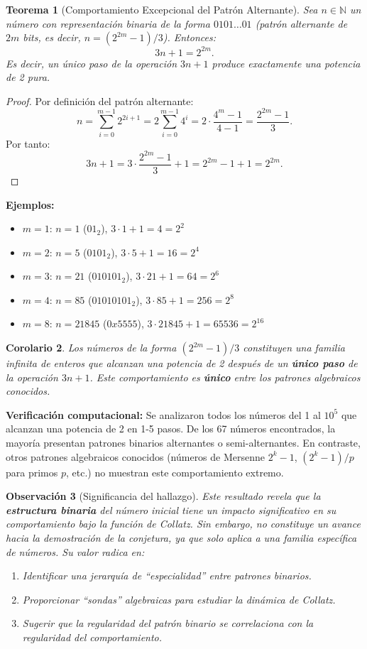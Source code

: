 \documentclass[11pt,a4paper]{article}
\newtheorem{theorem}{Teorema}[section]
\newtheorem{corollary}[theorem]{Corolario}
\newtheorem{remark}[theorem]{Observación}
\begin{document}
\begin{theorem}[Comportamiento Excepcional del Patrón Alternante]
\label{thm:patron_alternante}
Sea $n \in \mathbb{N}$ un número con representación binaria de la forma $0101\dots01$ (patrón alternante de $2m$ bits, es decir, $n = (2^{2m} - 1)/3$). Entonces:
\[
3n + 1 = 2^{2m}.
\]
Es decir, un único paso de la operación $3n+1$ produce exactamente una potencia de 2 pura.
\end{theorem}

\begin{proof}
Por definición del patrón alternante:
\[
n = \sum_{i=0}^{m-1} 2^{2i+1} = 2 \sum_{i=0}^{m-1} 4^i = 2 \cdot \frac{4^m - 1}{4 - 1} = \frac{2^{2m} - 1}{3}.
\]
Por tanto:
\[
3n + 1 = 3 \cdot \frac{2^{2m} - 1}{3} + 1 = 2^{2m} - 1 + 1 = 2^{2m}.
\]
\end{proof}

\textbf{Ejemplos:}
\begin{itemize}
    \item $m=1$: $n=1$ ($01_2$), $3\cdot1+1=4=2^2$
    \item $m=2$: $n=5$ ($0101_2$), $3\cdot5+1=16=2^4$
    \item $m=3$: $n=21$ ($010101_2$), $3\cdot21+1=64=2^6$
    \item $m=4$: $n=85$ ($01010101_2$), $3\cdot85+1=256=2^8$
    \item $m=8$: $n=21845$ ($0x5555$), $3\cdot21845+1=65536=2^{16}$
\end{itemize}

\begin{corollary}
Los números de la forma $(2^{2m}-1)/3$ constituyen una familia infinita de enteros que alcanzan una potencia de 2 después de un \textbf{único paso} de la operación $3n+1$. Este comportamiento es \textbf{único} entre los patrones algebraicos conocidos.
\end{corollary}

\textbf{Verificación computacional:} Se analizaron todos los números del 1 al $10^5$ que alcanzan una potencia de 2 en 1-5 pasos. De los 67 números encontrados, la mayoría presentan patrones binarios alternantes o semi-alternantes. En contraste, otros patrones algebraicos conocidos (números de Mersenne $2^k-1$, $(2^k-1)/p$ para primos $p$, etc.) no muestran este comportamiento extremo.

\begin{remark}[Significancia del hallazgo]
Este resultado revela que la \textbf{estructura binaria} del número inicial tiene un impacto significativo en su comportamiento bajo la función de Collatz. Sin embargo, no constituye un avance hacia la demostración de la conjetura, ya que solo aplica a una familia específica de números. Su valor radica en:
\begin{enumerate}
    \item Identificar una jerarquía de ``especialidad'' entre patrones binarios.
    \item Proporcionar ``sondas'' algebraicas para estudiar la dinámica de Collatz.
    \item Sugerir que la regularidad del patrón binario se correlaciona con la regularidad del comportamiento.
\end{enumerate}
\end{remark}
\end{document}

